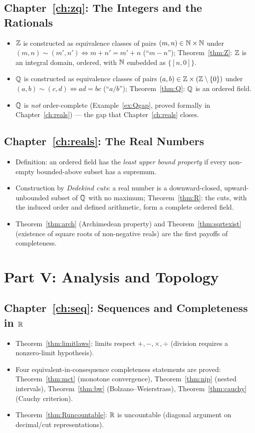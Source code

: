 \subsection*{Chapter~\ref{ch:zq}: The Integers and the Rationals}
\begin{itemize}
	\item $\mathbb{Z}$ is constructed as equivalence classes of pairs $(m,n)\in\mathbb{N}\times\mathbb{N}$ under $(m,n)\sim(m',n')\iff m+n'=m'+n$ (``$m-n$''); Theorem~\ref{thm:Z}: $\mathbb{Z}$ is an integral domain, ordered, with $\mathbb{N}$ embedded as $\{[n,0]\}$.
	\item $\mathbb{Q}$ is constructed as equivalence classes of pairs $(a,b)\in\mathbb{Z}\times(\mathbb{Z}\setminus\{0\})$ under $(a,b)\sim(c,d)\iff ad=bc$ (``$a/b$''); Theorem~\ref{thm:Q}: $\mathbb{Q}$ is an ordered field.
	\item $\mathbb{Q}$ is \emph{not} order-complete (Example~\ref{ex:Qgap}, proved formally in Chapter~\ref{ch:reals}) --- the gap that Chapter~\ref{ch:reals} closes.
\end{itemize}

\subsection*{Chapter~\ref{ch:reals}: The Real Numbers}
\begin{itemize}
	\item Definition: an ordered field has the \emph{least upper bound property} if every non-empty bounded-above subset has a supremum.
	\item Construction by \emph{Dedekind cuts}: a real number is a downward-closed, upward-unbounded subset of $\mathbb{Q}$ with no maximum; Theorem~\ref{thm:R}: the cuts, with the induced order and defined arithmetic, form a complete ordered field.
	\item Theorem~\ref{thm:arch} (Archimedean property) and Theorem~\ref{thm:sqrtexist} (existence of square roots of non-negative reals) are the first payoffs of completeness.
\end{itemize}

\section*{Part V: Analysis and Topology}

\subsection*{Chapter~\ref{ch:seq}: Sequences and Completeness in $\mathbb{R}$}
\begin{itemize}
	\item Theorem~\ref{thm:limitlaws}: limits respect $+,-,\times,\div$ (division requires a nonzero-limit hypothesis).
	\item Four equivalent-in-consequence completeness statements are proved: Theorem~\ref{thm:mct} (monotone convergence), Theorem~\ref{thm:nip} (nested intervals), Theorem~\ref{thm:bw} (Bolzano--Weierstrass), Theorem~\ref{thm:cauchy} (Cauchy criterion).
	\item Theorem~\ref{thm:Runcountable}: $\mathbb{R}$ is uncountable (diagonal argument on decimal/cut representations).
\end{itemize}

